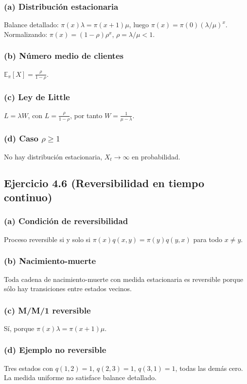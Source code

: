 \documentclass[12pt]{article}
\newcommand{\E}{\mathbb{E}}
\newcommand{\1}{\mathbf{1}}
\begin{document}
\subsubsection*{(a) Distribuci\'on estacionaria}
Balance detallado: $\pi(x)\lambda=\pi(x+1)\mu$, luego $\pi(x)=\pi(0)(\lambda/\mu)^x$. Normalizando: $\pi(x)=(1-\rho)\rho^x$, $\rho=\lambda/\mu<1$.

\subsubsection*{(b) N\'umero medio de clientes}
$\E_\pi[X]=\frac{\rho}{1-\rho}$.

\subsubsection*{(c) Ley de Little}
$L=\lambda W$, con $L=\frac{\rho}{1-\rho}$, por tanto $W=\frac{1}{\mu-\lambda}$.

\subsubsection*{(d) Caso $\rho\ge1$}
No hay distribuci\'on estacionaria, $X_t\to\infty$ en probabilidad.

\subsection{Ejercicio 4.6 (Reversibilidad en tiempo continuo)}

\subsubsection*{(a) Condici\'on de reversibilidad}
Proceso reversible si y solo si $\pi(x)q(x,y)=\pi(y)q(y,x)$ para todo $x\neq y$.

\subsubsection*{(b) Nacimiento-muerte}
Toda cadena de nacimiento-muerte con medida estacionaria es reversible porque s\'olo hay transiciones entre estados vecinos.

\subsubsection*{(c) M/M/1 reversible}
S\'i, porque $\pi(x)\lambda=\pi(x+1)\mu$.

\subsubsection*{(d) Ejemplo no reversible}
Tres estados con $q(1,2)=1$, $q(2,3)=1$, $q(3,1)=1$, todas las dem\'as cero. La medida uniforme no satisface balance detallado.
\end{document}
